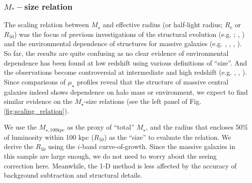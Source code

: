 \documentclass{emulateapj}
\def\mstar{{$M_{\star}$}}
\def\mtot{{$M_{\star,100\mathrm{kpc}}$}}
\def\mden{{$\mu_{\star}$}}
\begin{document}
\begin{CJK*}{UTF8}{gbsn}
\subsubsection{$M_{\ast}-$size relation}
    \label{sssec:mass_size}
        
    The scaling relation between \mstar{} and effective radius (or half-light radius;
    $R_{\mathrm{e}}$ or $R_{\mathrm{50}}$) 
    was the focus of previous investigations of the structural evolution 
    (e.g. \citealt{Shankar2013}; \citealt{Leja2013}, \citealt{vdWel2014}) and 
    the environmental dependence of structures for massive galaxies 
    (e.g. \citealt{Weinmann2009}, \citealt{Nair2010}, \citealt{HCompany13}, 
    \citealt{Cerbrian2014}). 
    So far, the results are quite confusing as no clear evidence of environmental 
    dependence has been found at low redshift using various definitions of ``size''. 
    And the observations become controversial at intermediate and high redshift
    (e.g. \citealt{MCooper2012}, \citealt{Papovich2012}, \citealt{Kelkar2015}).
    Since comparisons of \mden{} profiles reveal that the structure of massive central 
    galaxies indeed shows dependence on halo mass or environment, we expect to find 
    similar evidence on the \mstar{}-size relations (see the left panel of 
    Fig.\ref{fig:scaling_relation}).
     
    We use the \mtot{} as the proxy of ``total'' \mstar{}, and the 
    radius that encloses 50\% of luminosity within 100 kpc ($R_{\mathrm{50}}$) as 
    the ``size'' to evaluate the relation.
    We derive the $R_{\mathrm{50}}$ using the $i$-band curve-of-growth. 
    Since the massive galaxies in this sample are large enough, we do not need to 
    worry about the seeing correction here. 
    Meanwhile, the 1-D method is less affected by the accuracy of background 
    subtraction and structural details.
    
    

\end{CJK*}
\end{document}
